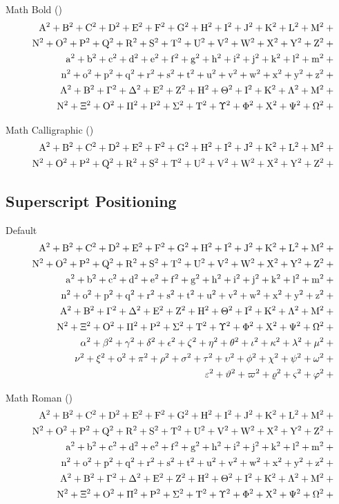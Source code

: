 \documentclass[12pt, a4paper, oneside]{article}
\theoremstyle{Plain}
\theoremstyle{Definition}
\theoremstyle{Remark}
\begin{document}
\begin{appendix}
Math Bold (\texttt{\string\mathbf})
\def\test#1{|\mathbf{#1}|+{}}%
\begin{eqnarray*}
  && {\testupperi}\\
  && {\testupperii}\\
  && {\testloweri}\\
  && {\testlowerii}\\
  && {\testupgreeki}\\
  && {\testupgreekii}
\end{eqnarray*}%

Math Calligraphic (\texttt{\string\mathcal})
\def\test#1{|\mathcal{#1}|+{}}%
\begin{eqnarray*}
  && {\testupperi}\\
  && {\testupperii}
\end{eqnarray*}%


\subsection{Superscript Positioning \showfamily}

Default
\def\test#1{#1^{2}+{}}%
\begin{eqnarray*}
  && {\testupperi}\\
  && {\testupperii}\\
  && {\testloweri}\\
  && {\testlowerii}\\
  && {\testupgreeki}\\
  && {\testupgreekii}\\
  && {\testlowgreeki}\\
  && {\testlowgreekii}\\
  && {\testlowgreekiii}
\end{eqnarray*}%

Math Roman (\texttt{\string\mathrm})
\def\test#1{\mathrm{#1}^{2}+{}}%
\begin{eqnarray*}
  && {\testupperi}\\
  && {\testupperii}\\
  && {\testloweri}\\
  && {\testlowerii}\\
  && {\testupgreeki}\\
  && {\testupgreekii}
\end{eqnarray*}%



\end{appendix}
\end{document}
